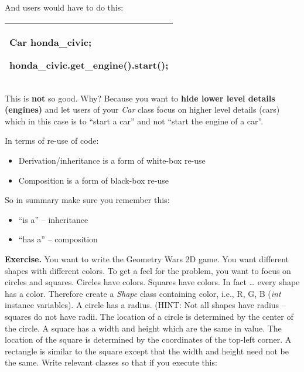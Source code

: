 \documentclass[
]{article}
\providecommand{\tightlist}{%
  \setlength{\itemsep}{0pt}\setlength{\parskip}{0pt}}
\begin{document}
And users would have to do this:

\begin{longtable}[]{@{}l@{}}
\toprule
\endhead
\begin{minipage}[t]{0.97\columnwidth}\raggedright
Car honda\_civic;

honda\_civic.get\_engine().start();\strut
\end{minipage}\tabularnewline
\bottomrule
\end{longtable}

This is \textbf{not} so good. Why? Because you want to \textbf{hide
lower level details (engines)} and let users of your \emph{Car} class
focus on higher level details (cars) which in this case is to ``start a
car'' and not ``start the engine of a car''.

In terms of re-use of code:

\begin{itemize}
\tightlist
\item
  Derivation/inheritance is a form of white-box re-use
\item
  Composition is a form of black-box re-use
\end{itemize}

So in summary make sure you remember this:

\begin{itemize}
\tightlist
\item
  ``is a'' -- inheritance
\item
  ``has a'' -- composition
\end{itemize}

\textbf{Exercise. }You want to write the Geometry Wars 2D game. You want
different shapes with different colors. To get a feel for the problem,
you want to focus on circles and squares. Circles have colors. Squares
have colors. In fact \ldots{} every shape has a color. Therefore create
a \emph{Shape} class containing color, i.e., R, G, B (\emph{int}
instance variables). A circle has a radius. (HINT: Not all shapes have
radius -- squares do not have radii. The location of a circle is
determined by the center of the circle. A square has a width and height
which are the same in value. The location of the square is determined by
the coordinates of the top-left corner. A rectangle is similar to the
square except that the width and height need not be the same. Write
relevant classes so that if you execute this:
\end{document}
